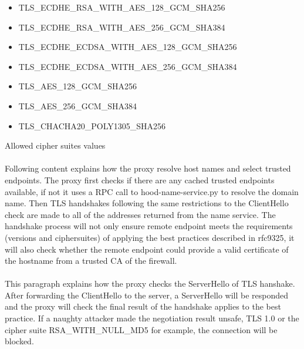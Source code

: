 \documentclass[mscthesis]{usiinfthesis}
\begin{document}
\begin{table}[H]
  \begin{itemize}
    \item TLS\_ECDHE\_RSA\_WITH\_AES\_128\_GCM\_SHA256
    \item TLS\_ECDHE\_RSA\_WITH\_AES\_256\_GCM\_SHA384
    \item TLS\_ECDHE\_ECDSA\_WITH\_AES\_128\_GCM\_SHA256
    \item TLS\_ECDHE\_ECDSA\_WITH\_AES\_256\_GCM\_SHA384
    \item TLS\_AES\_128\_GCM\_SHA256
    \item TLS\_AES\_256\_GCM\_SHA384
    \item TLS\_CHACHA20\_POLY1305\_SHA256
  \end{itemize}
  \caption{Allowed cipher suites values}
  \label{lst:tls-ciphersuites}
\end{table}

\paragraph{}
Following content explains how the proxy resolve host names and select trusted endpoints. The proxy first checks if there are any cached trusted endpoints available, if not it uses a RPC call to hood-name-service.py to resolve the domain name. Then TLS handshakes following the same restrictions to the ClientHello check are made to all of the addresses returned from the name service. The handshake process will not only ensure remote endpoint meets the requirements (versions and ciphersuites) of applying the best practices described in rfc9325, it will also check whether the remote endpoint could provide a valid certificate of the hostname from a trusted CA of the firewall.
\paragraph{}
This paragraph explains how the proxy checks the ServerHello of TLS hanshake. After forwarding the ClientHello to the server, a ServerHello will be responded and the proxy will check the final result of the handshake applies to the best practice. If a naughty attacker made the negotiation result unsafe, TLS 1.0 or the cipher suite RSA\_WITH\_NULL\_MD5 for example, the connection will be blocked.
\end{document}

